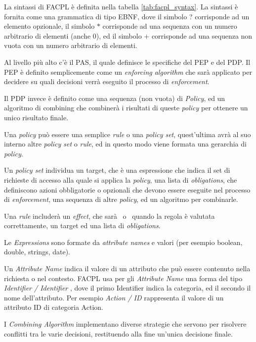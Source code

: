 

La sintassi di \ac{FACPL} è definita nella tabella \ref{tab:facpl_syntax}.
La sintassi è fornita come una grammatica di tipo \ac{EBNF}, dove il simbolo ? corrisponde ad un elemento opzionale, il simbolo $*$ corrisponde ad una sequenza con un numero arbitrario di elementi (anche $0$), ed il simbolo $+$ corrisponde ad una sequenza non vuota con un numero arbitrario di elementi. \par
Al livello più alto c'è il \ac{PAS}, il quale definisce le specifiche del \ac{PEP} e del \ac{PDP}. Il \ac{PEP} è definito semplicemente come un \textit{enforcing algorithm} che sarà applicato per decidere su quali decisioni verrà eseguito il processo di \textit{enforcement}.  \par
Il \ac{PDP} invece è definito come una sequenza (non vuota) di \textit{Policy}, ed un algoritmo di combining che combinerà i risultati di queste \textit{policy} per ottenere un unico risultato finale. \par
Una \textit{policy} può essere una semplice \textit{rule} o una \textit{policy set}, quest'ultima avrà al suo interno altre \textit{policy set} o \textit{rule}, ed in questo modo viene formata una gerarchia di \textit{policy}. \par
Un \textit{policy set} individua un target, che è una espressione che indica il set di richieste di accesso alla quale si applica la \textit{policy}, una lista di \textit{obligations}, che definiscono azioni obbligatorie o opzionali che devono essere eseguite nel processo di \textit{enforcement}, una sequenza di altre \textit{policy}, ed un algoritmo per combinarle. \par
Una \textit{rule} includerà un \textit{effect}, che sarà \permit \ o \deny \ quando la regola è valutata correttamente, un target ed una lista di \textit{obligations}. \par
Le \textit{Expressions} sono formate da \textit{attribute names} e valori (per esempio boolean, double, strings, date). \par
Un \textit{Attribute Name} indica il valore di un attributo che può essere contenuto nella richiesta o nel contesto. FACPL usa per gli \textit{Attribute Name} una forma del tipo \textit{Identifier / Identifier }, dove il primo Identifier indica la categoria, ed il secondo il nome dell'attributo.
Per esempio \textit{Action / ID} rappresenta il valore di un attributo ID di categoria Action. \par
I \textit{Combining Algorithm} implementano diverse strategie che servono per risolvere conflitti tra le varie decisioni, restituendo alla fine un'unica decisione finale. \par

